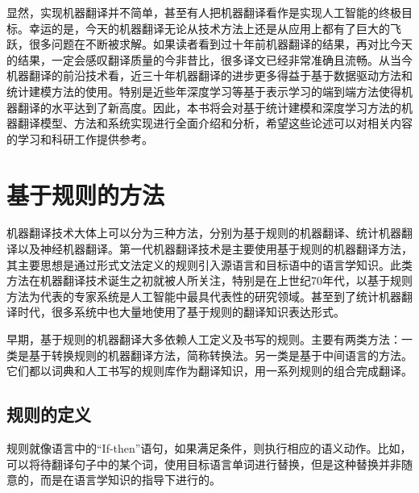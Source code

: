 \parinterval 显然，实现机器翻译并不简单，甚至有人把机器翻译看作是实现人工智能的终极目标。幸运的是，今天的机器翻译无论从技术方法上还是从应用上都有了巨大的飞跃，很多问题在不断被求解。如果读者看到过十年前机器翻译的结果，再对比今天的结果，一定会感叹翻译质量的今非昔比，很多译文已经非常准确且流畅。从当今机器翻译的前沿技术看，近三十年机器翻译的进步更多得益于基于数据驱动方法和统计建模方法的使用。特别是近些年深度学习等基于表示学习的端到端方法使得机器翻译的水平达到了新高度。因此，本书将会对基于统计建模和深度学习方法的机器翻译模型、方法和系统实现进行全面介绍和分析，希望这些论述可以对相关内容的学习和科研工作提供参考。


\sectionnewpage
\section{基于规则的方法}\label{section-1.4}
\parinterval 机器翻译技术大体上可以分为三种方法，分别为基于规则的机器翻译、统计机器翻译以及神经机器翻译。第一代机器翻译技术是主要使用基于规则的机器翻译方法，其主要思想是通过形式文法定义的规则引入源语言和目标语中的语言学知识。此类方法在机器翻译技术诞生之初就被人所关注，特别是在上世纪70年代，以基于规则方法为代表的专家系统是人工智能中最具代表性的研究领域。甚至到了统计机器翻译时代，很多系统中也大量地使用了基于规则的翻译知识表达形式。

\parinterval 早期，基于规则的机器翻译大多依赖人工定义及书写的规则。主要有两类方法：一类是基于转换规则的机器翻译方法，简称转换法。另一类是基于中间语言的方法。它们都以词典和人工书写的规则库作为翻译知识，用一系列规则的组合完成翻译。


\subsection{规则的定义}

\parinterval 规则就像语言中的“If-then”语句，如果满足条件，则执行相应的语义动作。比如，可以将待翻译句子中的某个词，使用目标语言单词进行替换，但是这种替换并非随意的，而是在语言学知识的指导下进行的。

